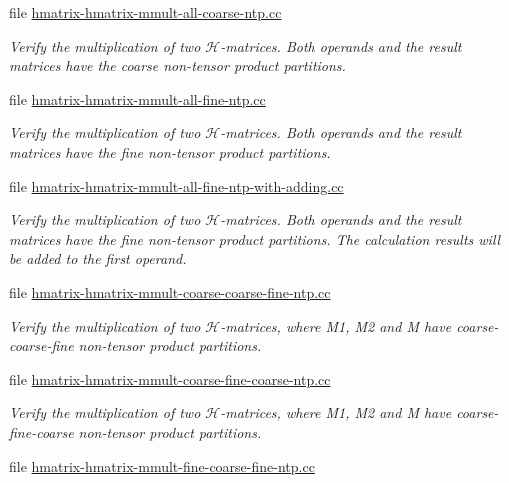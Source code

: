 \begin{DoxyCompactItemize}
file \hyperlink{hmatrix-hmatrix-mmult-all-coarse-ntp_8cc}{hmatrix-\/hmatrix-\/mmult-\/all-\/coarse-\/ntp.\+cc}
\begin{DoxyCompactList}\small\item\em Verify the multiplication of two $\mathcal{H}$-\/matrices. Both operands and the result matrices have the coarse non-\/tensor product partitions. \end{DoxyCompactList}\item 
file \hyperlink{hmatrix-hmatrix-mmult-all-fine-ntp_8cc}{hmatrix-\/hmatrix-\/mmult-\/all-\/fine-\/ntp.\+cc}
\begin{DoxyCompactList}\small\item\em Verify the multiplication of two $\mathcal{H}$-\/matrices. Both operands and the result matrices have the fine non-\/tensor product partitions. \end{DoxyCompactList}\item 
file \hyperlink{hmatrix-hmatrix-mmult-all-fine-ntp-with-adding_8cc}{hmatrix-\/hmatrix-\/mmult-\/all-\/fine-\/ntp-\/with-\/adding.\+cc}
\begin{DoxyCompactList}\small\item\em Verify the multiplication of two $\mathcal{H}$-\/matrices. Both operands and the result matrices have the fine non-\/tensor product partitions. The calculation results will be added to the first operand. \end{DoxyCompactList}\item 
file \hyperlink{hmatrix-hmatrix-mmult-coarse-coarse-fine-ntp_8cc}{hmatrix-\/hmatrix-\/mmult-\/coarse-\/coarse-\/fine-\/ntp.\+cc}
\begin{DoxyCompactList}\small\item\em Verify the multiplication of two $\mathcal{H}$-\/matrices, where M1, M2 and M have coarse-\/coarse-\/fine non-\/tensor product partitions. \end{DoxyCompactList}\item 
file \hyperlink{hmatrix-hmatrix-mmult-coarse-fine-coarse-ntp_8cc}{hmatrix-\/hmatrix-\/mmult-\/coarse-\/fine-\/coarse-\/ntp.\+cc}
\begin{DoxyCompactList}\small\item\em Verify the multiplication of two $\mathcal{H}$-\/matrices, where M1, M2 and M have coarse-\/fine-\/coarse non-\/tensor product partitions. \end{DoxyCompactList}\item 
file \hyperlink{hmatrix-hmatrix-mmult-fine-coarse-fine-ntp_8cc}{hmatrix-\/hmatrix-\/mmult-\/fine-\/coarse-\/fine-\/ntp.\+cc}

\end{DoxyCompactItemize}
